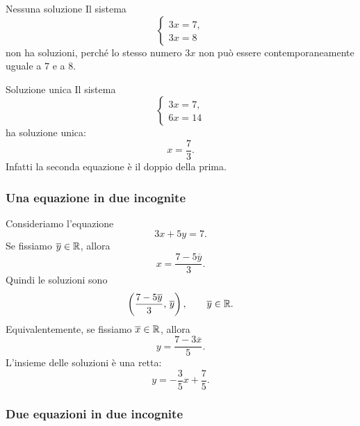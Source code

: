 \documentclass[a4paper]{article}
\begin{document}
\begin{snippetexample}{Nessuna soluzione}
    Il sistema
    \[
        \begin{cases}
            3x=7,\\
            3x=8
        \end{cases}
    \]
    non ha soluzioni, perché lo stesso numero \(3x\) non può essere contemporaneamente uguale a \(7\) e a \(8\).
\end{snippetexample}

\begin{snippetexample}{Soluzione unica}
    Il sistema
    \[
        \begin{cases}
            3x=7,\\
            6x=14
        \end{cases}
    \]
    ha soluzione unica:
    \[
        x=\frac{7}{3}.
    \]
    Infatti la seconda equazione è il doppio della prima.
\end{snippetexample}

\subsubsection{Una equazione in due incognite}

Consideriamo l'equazione
\[
    3x+5y=7.
\]
Se fissiamo \(\overline{y}\in\mathbb{R}\), allora
\[
    x=\frac{7-5\overline{y}}{3}.
\]
Quindi le soluzioni sono
\[
    \left(\frac{7-5\overline{y}}{3},\,\overline{y}\right),
    \qquad
    \overline{y}\in\mathbb{R}.
\]
Equivalentemente, se fissiamo \(\overline{x}\in\mathbb{R}\), allora
\[
    y=\frac{7-3\overline{x}}{5}.
\]
L'insieme delle soluzioni è una retta:
\[
    y=-\frac{3}{5}x+\frac{7}{5}.
\]

\begin{center}
\end{center}

\subsubsection{Due equazioni in due incognite}
\end{document}
